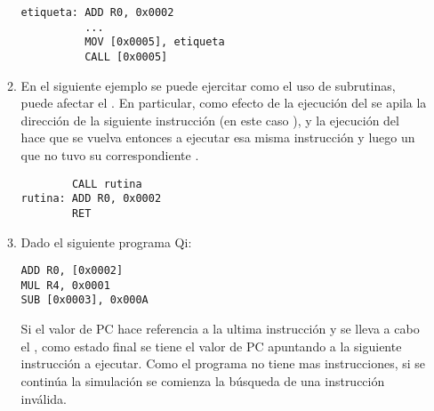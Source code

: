 \begin{enumerate}
\begin{enumerate}
\begin{verbatim}
etiqueta: ADD R0, 0x0002 
          ...
          MOV [0x0005], etiqueta
          CALL [0x0005] 
\end{verbatim}

\item En el siguiente ejemplo se puede ejercitar como el uso de subrutinas, puede afectar el \ciclo. En particular, como efecto de la ejecución del  se apila la dirección de la siguiente instrucción (en este caso ), y la ejecución del  hace que se vuelva entonces a ejecutar esa misma instrucción y luego un  que no tuvo su correspondiente .

\begin{verbatim}
        CALL rutina 
rutina: ADD R0, 0x0002 
        RET 
\end{verbatim}



\item Dado el siguiente programa Qi:

\begin{verbatim}
ADD R0, [0x0002]
MUL R4, 0x0001
SUB [0x0003], 0x000A 
\end{verbatim}

Si el valor de PC hace referencia a la ultima instrucción y se lleva a cabo el \ciclo, como estado final se tiene el valor de PC apuntando a la siguiente instrucción a ejecutar. Como el programa no tiene mas instrucciones, si se continúa la simulación se comienza la búsqueda de una instrucción inválida.

\end{enumerate} 




\end{enumerate}
